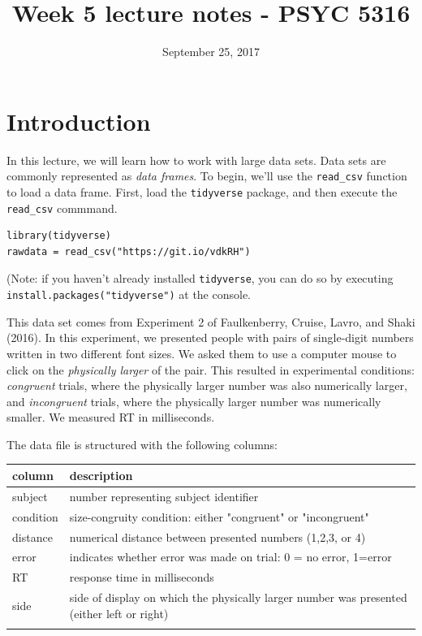 \documentclass[11pt]{article}
\date{September 25, 2017}
\title{Week 5 lecture notes - PSYC 5316}
\begin{document}
\maketitle

\section*{Introduction}
\label{sec-1}
In this lecture, we will learn how to work with large data sets.  Data sets are commonly represented as \emph{data frames}.  To begin, we'll use the \texttt{read\_csv} function to load a data frame.  First, load the \texttt{tidyverse} package, and then execute the \texttt{read\_csv} commmand.

\begin{verbatim}
library(tidyverse)
rawdata = read_csv("https://git.io/vdkRH")
\end{verbatim}

(Note: if you haven't already installed \texttt{tidyverse}, you can do so by executing \texttt{install.packages("tidyverse")} at the console.

This data set comes from Experiment 2 of Faulkenberry, Cruise, Lavro, and Shaki (2016).  In this experiment, we presented people with pairs of single-digit numbers written in two different font sizes. We asked them to use a computer mouse to click on the \emph{physically larger} of the pair.  This resulted in experimental conditions: \emph{congruent} trials, where the physically larger number was also numerically larger, and \emph{incongruent} trials, where the physically larger number was numerically smaller.  We measured RT in milliseconds.

The data file is structured with the following columns:

\begin{center}
\begin{tabular}{ll}
column & description\\
\hline
subject & number representing subject identifier\\
condition & size-congruity condition: either "congruent" or "incongruent"\\
distance & numerical distance between presented numbers (1,2,3, or 4)\\
error & indicates whether error was made on trial: 0 = no error, 1=error\\
RT & response time in milliseconds\\
side & side of display on which the physically larger number was presented (either left or right)\\
 & \\
\end{tabular}
\end{center}
\end{document}
